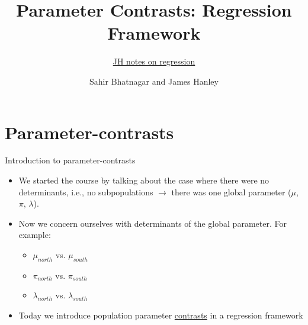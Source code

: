\documentclass{beamer}\usepackage[]{graphicx}\usepackage[]{color}
\begin{document}




\title{Parameter Contrasts: Regression Framework}
\subtitle{\href{https://www.dropbox.com/s/1l3i59rw1qsnmsz/EPIB607introToRegression.pdf?dl=0}{JH notes on regression}}
\author{Sahir Bhatnagar and James Hanley}


\maketitle

\section{Parameter-contrasts}

\begin{frame}{Introduction to parameter-contrasts}

\begin{itemize}
	\setlength\itemsep{2em}
	\item We started the course by talking about the case where there were no determinants, i.e., no subpopulations $\to$ there was one global parameter ($\mu$, $\pi$, $\lambda$). \pause 
	\item Now we concern ourselves with determinants of the global parameter. For example:
	\begin{itemize}
		\item $\mu_{north}$ vs. $\mu_{south}$
		\item $\pi_{north}$ vs. $\pi_{south}$
		\item $\lambda_{north}$ vs. $\lambda_{south}$
	\end{itemize}
	\pause 
	\item Today we introduce population parameter \underline{contrasts} in a regression framework
	
\end{itemize}

\end{frame}
\end{document}
